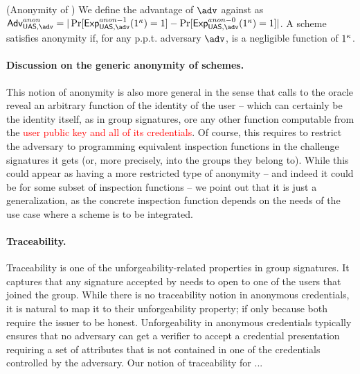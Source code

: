 \begin{definition}{(Anonymity of \GSAC)}
  We define the advantage \AdvAnon of $\adv$ against \ExpAnonb as
  $\AdvAnon=|\Pr\lbrack\ExpAnono(1^\secpar)=1\rbrack-
  \Pr\lbrack\ExpAnonz(1^\secpar)=1\rbrack|$.
  A \GSAC scheme satisfies anonymity if, for any p.p.t. adversary $\adv$,
  \AdvAnon is a negligible function of $1^\kappa$.
\end{definition}

\paragraph{Discussion on the generic anonymity of \UAS schemes.} %
This notion of anonymity is also more general in the sense that calls to
the \INSPECT oracle reveal an arbitrary function of the identity of the user
-- which can certainly be the identity itself, as in group signatures, ore any
other function computable from the \textcolor{red}{user public key and all of
  its credentials}. Of course, this requires to restrict the adversary to
programming equivalent inspection functions in the challenge signatures it
gets (or, more precisely, into the groups they belong to). While this could
appear as having a more restricted type of anonymity -- and indeed it could be
for some subset of inspection functions -- we point out that it is just a
generalization, as the concrete inspection function depends on the needs of
the use case where a \UAS scheme is to be integrated.

\paragraph{Traceability.} %
Traceability is one of the unforgeability-related properties in group
signatures. It captures that any signature accepted by \Verify needs to open
to one of the users that joined the group. While there is no traceability notion
in anonymous credentials, it is natural to map it to their unforgeability
property; if only because both require the issuer to be honest. Unforgeability
in anonymous credentials typically ensures that no adversary can get a verifier
to accept a credential presentation requiring a set of attributes that is not
contained in one of the credentials controlled by the adversary.
%
Our notion of traceability for \UAS...

